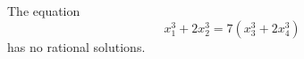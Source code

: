 \begin{proposition}\label{eq:046}
    The equation
\[
    x_1^3+2x_2^3=7(x_3^3+2x_4^3)
\]
    has no rational solutions.
\end{proposition}
